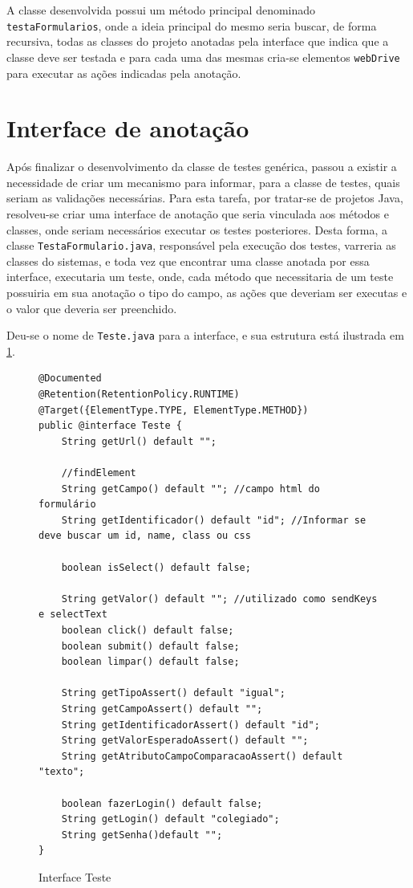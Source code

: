 \documentclass[tg]{mdtufsm}
\begin{document}
A classe desenvolvida possui um método principal denominado \texttt{testaFormularios}, onde a ideia principal do mesmo seria buscar,
de forma recursiva, todas as classes do projeto anotadas pela interface que indica que a classe deve ser testada e para cada uma das mesmas cria-se elementos \texttt{webDrive} para executar as ações indicadas pela anotação.

\section{Interface de anotação}

Após finalizar o desenvolvimento da classe de testes genérica, passou a existir a necessidade de criar um mecanismo para informar, para a classe de testes, quais seriam as validações necessárias. Para esta tarefa,
por tratar-se de projetos Java, resolveu-se criar uma interface de anotação que seria vinculada aos métodos e classes, onde seriam necessários executar os testes posteriores. Desta forma, a classe \texttt{TestaFormulario.java},
responsável pela execução dos testes, varreria as classes do sistemas, e toda vez que encontrar uma classe anotada por essa interface, executaria um teste, onde, cada método que necessitaria de um teste possuiria em sua anotação o tipo do campo,
as ações que deveriam ser executas e o valor que deveria ser preenchido.

Deu-se o nome de \texttt{Teste.java} para a interface, e sua estrutura está ilustrada em \ref{code:Teste.java}.

\begin{figure}[!htt]
\begin{lstlisting}
@Documented
@Retention(RetentionPolicy.RUNTIME)
@Target({ElementType.TYPE, ElementType.METHOD})
public @interface Teste {
    String getUrl() default "";

    //findElement
    String getCampo() default ""; //campo html do formulário
    String getIdentificador() default "id"; //Informar se deve buscar um id, name, class ou css

    boolean isSelect() default false;

    String getValor() default ""; //utilizado como sendKeys e selectText
    boolean click() default false;
    boolean submit() default false;
    boolean limpar() default false;

    String getTipoAssert() default "igual";
    String getCampoAssert() default "";
    String getIdentificadorAssert() default "id";
    String getValorEsperadoAssert() default "";
    String getAtributoCampoComparacaoAssert() default "texto";

    boolean fazerLogin() default false;
    String getLogin() default "colegiado";
    String getSenha()default "";
}
\end{lstlisting}
	\caption{Interface Teste}
	\label{code:Teste.java}
\end{figure}
\end{document}
